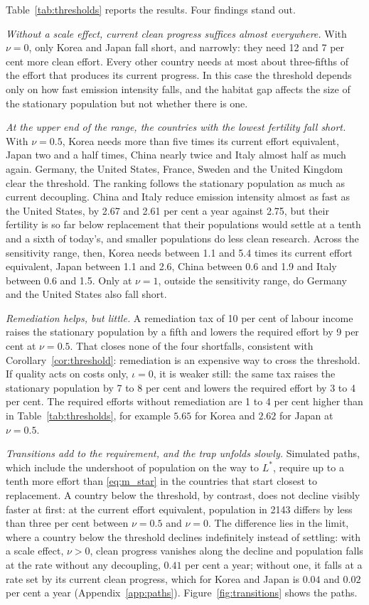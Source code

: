\documentclass[11pt]{article}
\begin{document}
Table~\ref{tab:thresholds} reports the results. Four findings stand out.

\emph{Without a scale effect, current clean progress suffices almost everywhere.} With $\nu=0$, only Korea
and Japan fall short, and narrowly: they need 12 and 7 per cent more clean effort. Every other country
needs at most about three-fifths of the effort that produces its current progress. In this case the threshold
depends only on how fast emission intensity falls, and the habitat gap affects the size of the
stationary population but not whether there is one.

\emph{At the upper end of the range, the countries with the lowest fertility fall short.} With $\nu=0.5$,
Korea needs more than five times its current effort equivalent, Japan two and a half times, China nearly twice
and Italy almost half as much again. Germany, the United States, France, Sweden and the United Kingdom clear the
threshold. The ranking follows the stationary population as much as current decoupling. China and Italy
reduce emission intensity almost as fast as the United States, by 2.67 and 2.61 per cent a year against
2.75, but their fertility is so far below replacement that their populations would settle at a tenth and a
sixth of today's, and smaller populations do less clean research. Across the sensitivity range, then,
Korea needs between 1.1 and 5.4 times its current effort equivalent, Japan between 1.1 and 2.6, China between 0.6
and 1.9 and Italy between 0.6 and 1.5. Only at $\nu=1$, outside the sensitivity range, do Germany and the United States also fall
short.

\emph{Remediation helps, but little.} A remediation tax of 10 per cent of labour income raises the
stationary population by a fifth and lowers the required effort by 9 per cent at $\nu=0.5$. That closes
none of the four shortfalls, consistent with Corollary~\ref{cor:threshold}: remediation is an expensive way
to cross the threshold. If quality acts on costs only, $\iota=0$, it is weaker still: the same tax raises
the stationary population by 7 to 8 per cent and lowers the required effort by 3 to 4 per cent. The
required efforts without remediation are 1 to 4 per cent higher than in Table~\ref{tab:thresholds}, for
example $5.65$ for Korea and $2.62$ for Japan at $\nu=0.5$.

\emph{Transitions add to the requirement, and the trap unfolds slowly.} Simulated paths, which include
the undershoot of population on the way to $L^\ast$, require up to a tenth more effort than
\eqref{eq:m_star} in the countries that start closest to replacement. A country below the threshold,
by contrast, does not decline visibly faster at first: at the current effort equivalent, population in 2143 differs
by less than three per cent between $\nu=0.5$ and $\nu=0$. The difference lies in the limit, where a country
below the threshold declines indefinitely instead of settling: with a scale effect, $\nu>0$, clean
progress vanishes along the decline and population falls at the rate without any decoupling, $0.41$ per
cent a year; without one, it falls at a rate set by its current clean progress, which for Korea and
Japan is $0.04$ and $0.02$ per cent a year (Appendix~\ref{app:paths}).
Figure~\ref{fig:transitions} shows the paths.
\end{document}
